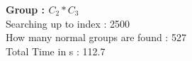 \textbf{Group : $C_2*C_3$}\\
Searching up to index : 2500\\
How many normal groups are found : 527\\
Total Time in s : 112.7\\
